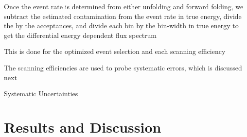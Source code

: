 \documentclass{article}
\begin{document}
\begin{myEnumerate}
\begin{myEnumerate}
\begin{myEnumerate}
			\end{myEnumerate}
			\item Once the event rate is determined from either unfolding and forward folding, we subtract the estimated contamination from the event rate in true energy, divide the by the acceptances, and divide each bin by the bin-width in true energy to get the differential energy dependent flux spectrum
			\item This is done for the optimized event selection and each scanning efficiency
			\item The scanning efficiencies are used to probe systematic errors, which is discussed next
		\end{myEnumerate}
		\item Systematic Uncertainties
		\begin{myEnumerate}
			\item 
			\item
		\end{myEnumerate}
	\end{myEnumerate}
\section{Results and Discussion}
	\begin{myEnumerate}
		\item 
	\end{myEnumerate}
\end{document}
